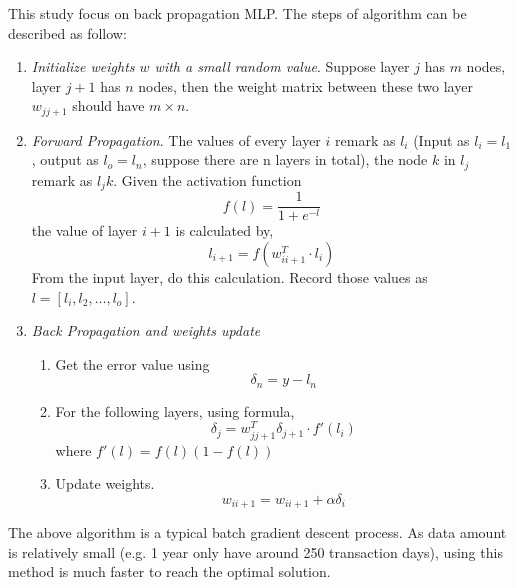 This study focus on back propagation MLP. The steps of algorithm can be described as follow\cite{russell2003artificial}:
\begin{enumerate}
	\item \textit{Initialize weights $ w $ with a small random value}. Suppose layer $ j $ has $ m $ nodes, layer $j + 1$ has $ n $ nodes, then the weight matrix between these two layer $ w_{jj+1} $ should have $ m \times n $.
	\item \textit{Forward Propagation}. The values of every layer $ i $ remark as $ l_i $ (Input as $ l_i =l_1 $, output as $l_o=l_n$, suppose there are n layers in total), the node $ k $ in $ l_j $ remark as $ l_jk $. Given the activation function
	\begin{equation}
	f(l) = \frac{1}{1+e^{-l}}
	\end{equation}
	the value of layer $ i + 1 $ is calculated by,
	\begin{equation}
	l_{i+1}=f(w_{ii+1}^T\cdot l_i)
	\end{equation}
	From the input layer, do this calculation. Record those values as $ l = [l_i, l_2, \ldots, l_o] $.
	\item \textit{Back Propagation and weights update} 
	\begin{enumerate}
		\item Get the error value using
		\begin{equation}
		\delta_n = y - l_n
		\end{equation}
		
		\item For the following layers, using formula,
		\begin{equation}
		\delta_j = w_{jj+1}^T\delta_{j+1}\cdot f'(l_i)
		\end{equation}
		where $ f'(l) = f(l)(1-f(l)) $
		
		\item Update weights.
		\begin{equation}
		w_{ii+1} = w_{ii+1} + \alpha \delta_i 
		\end{equation}
	\end{enumerate}
\end{enumerate}

The above algorithm is a typical batch gradient descent process. As data amount is relatively small (e.g. 1 year only have around 250 transaction days), using this method is much faster to reach the optimal solution.
